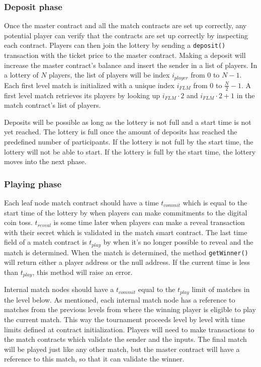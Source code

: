\subsubsection{Deposit phase}
Once the master contract and all the match contracts are set up correctly, any potential player can verify that the contracts are set up correctly by inspecting each contract. Players can then join the lottery by sending a \texttt{deposit()} transaction with the ticket price to the master contract. Making a deposit will increase the master contract's balance and insert the sender in a list of players. In a lottery of $N$ players, the list of players will be index $i_{player}$ from $0$ to $N-1$. Each first level match is initialized with a unique index $i_{FLM}$ from $0$ to $\frac{N}{2}-1$. A first level match retrieves its players by looking up $i_{FLM} \cdot 2$ and $i_{FLM} \cdot 2 + 1$ in the match contract's list of players.

Deposits will be possible as long as the lottery is not full and a start time is not yet reached. The lottery is full once the amount of deposits has reached the predefined number of participants. If the lottery is not full by the start time, the lottery will not be able to start. If the lottery is full by the start time, the lottery moves into the next phase.

\subsubsection{Playing phase}
Each leaf node match contract should have a time $t_{commit}$ which is equal to the start time of the lottery by when players can make commitments to the digital coin toss. $t_{reveal}$ is some time later when players can make a reveal transaction with their secret which is validated in the match smart contract. The last time field of a match contract is $t_{play}$ by when it's no longer possible to reveal and the match is determined. When the match is determined, the method \texttt{getWinner()} will return either a player address or the null address. If the current time is less than $t_{play}$, this method will raise an error.

Internal match nodes should have a $t_{commit}$ equal to the $t_{play}$ limit of matches in the level below. As mentioned, each internal match node has a reference to matches from the previous levels from where the winning player is eligible to play the current match. This way the tournament proceeds level by level with time limits defined at contract initialization. Players will need to make transactions to the match contracts which validate the sender and the inputs. The final match will be played just like any other match, but the master contract will have a reference to this match, so that it can validate the winner.

